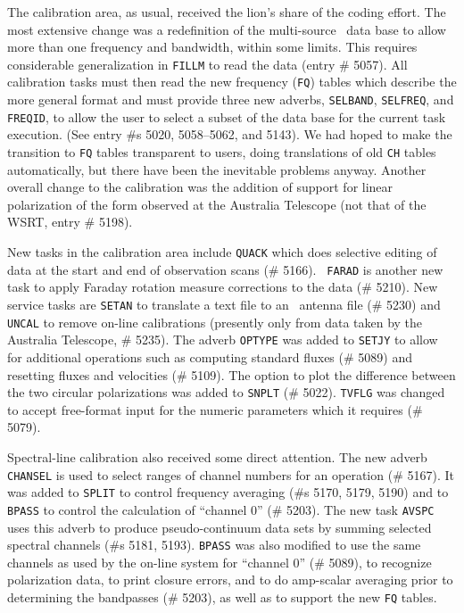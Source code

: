      The calibration area, as usual, received the lion's share
of the coding effort.  The most extensive change was a redefinition
of the multi-source \uv\ data base to allow more than one frequency
and bandwidth, within some limits.  This requires considerable
generalization in {\tt FILLM} to read the data (entry \# 5057).
All calibration tasks must then read the new frequency ({\tt FQ})
tables which describe the more general format and
must provide three new adverbs, {\tt SELBAND}, {\tt SELFREQ},
and {\tt FREQID}, to allow the user to select a subset of the
data base for the current task execution.  (See entry \#s 5020,
5058--5062, and 5143).  We had hoped to make the transition to
{\tt FQ} tables transparent to users, doing translations of old
{\tt CH} tables automatically, but there have been the inevitable
problems anyway.  Another overall change to the calibration was
the addition of support for linear polarization of the form
observed at the Australia Telescope (not that of the WSRT,
entry \# 5198).

New tasks in the calibration area include {\tt QUACK} which does selective
editing of data at the start and end of observation scans (\# 5166).  {\tt
FARAD} is another new task to apply Faraday rotation measure corrections to the
data (\# 5210).  New service tasks are {\tt SETAN} to translate a text file to
an \AIPS\ antenna file (\# 5230) and {\tt UNCAL} to remove on-line calibrations
(presently only from data taken by the Australia Telescope, \# 5235).  The
adverb {\tt OPTYPE} was added to {\tt SETJY} to allow for additional operations
such as computing standard fluxes (\# 5089) and resetting fluxes and velocities
(\# 5109).  The option to plot the difference between the two circular
polarizations was added to {\tt SNPLT} (\# 5022).  {\tt TVFLG} was
changed to accept free-format input for the numeric parameters which
it requires (\# 5079).

     Spectral-line calibration also received some direct attention.
The new adverb {\tt CHANSEL} is used to select ranges of channel
numbers for an operation (\# 5167).  It was added to {\tt SPLIT}
to control frequency averaging (\#s 5170, 5179, 5190) and to {\tt BPASS}
to control the calculation of ``channel 0'' (\# 5203).  The new task
{\tt AVSPC} uses this adverb to produce pseudo-continuum data sets
by summing selected spectral channels (\#s 5181, 5193).  {\tt BPASS}
was also modified to use the same channels as used by the on-line system
for ``channel 0'' (\# 5089), to recognize polarization data, to print
closure errors,  and to do amp-scalar averaging prior to determining
the bandpasses (\# 5203), as well as to support the new {\tt FQ}
tables.

